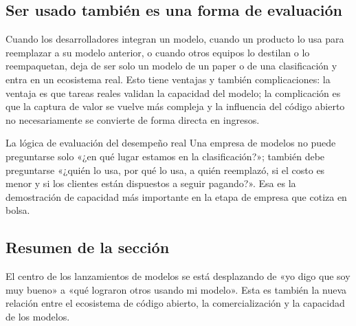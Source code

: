 \subsection{Ser usado también es una forma de evaluación}

Cuando los desarrolladores integran un modelo, cuando un producto lo usa para reemplazar a su modelo anterior, o cuando otros equipos lo destilan o lo reempaquetan, deja de ser solo un modelo de un paper o de una clasificación y entra en un ecosistema real. Esto tiene ventajas y también complicaciones: la ventaja es que tareas reales validan la capacidad del modelo; la complicación es que la captura de valor se vuelve más compleja y la influencia del código abierto no necesariamente se convierte de forma directa en ingresos.

\begin{importantbox}{La lógica de evaluación del desempeño real}
Una empresa de modelos no puede preguntarse solo «¿en qué lugar estamos en la clasificación?»; también debe preguntarse «¿quién lo usa, por qué lo usa, a quién reemplazó, si el costo es menor y si los clientes están dispuestos a seguir pagando?». Esa es la demostración de capacidad más importante en la etapa de empresa que cotiza en bolsa.
\end{importantbox}

\subsection{Resumen de la sección}

El centro de los lanzamientos de modelos se está desplazando de «yo digo que soy muy bueno» a «qué lograron otros usando mi modelo». Esta es también la nueva relación entre el ecosistema de código abierto, la comercialización y la capacidad de los modelos.
